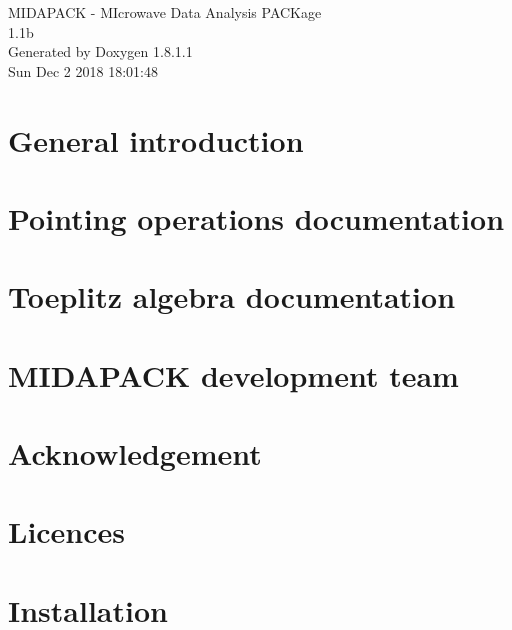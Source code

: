 \documentclass{book}
\begin{document}
\hypersetup{pageanchor=false,citecolor=blue}
\begin{titlepage}
\vspace*{7cm}
\begin{center}
{\Large M\-I\-D\-A\-P\-A\-C\-K -\/ M\-Icrowave Data Analysis P\-A\-C\-Kage \\[1ex]\large 1.\-1b }\\
\vspace*{1cm}
{\large Generated by Doxygen 1.8.1.1}\\
\vspace*{0.5cm}
{\small Sun Dec 2 2018 18:01:48}\\
\end{center}
\end{titlepage}
\clearemptydoublepage
{}
\tableofcontents
\clearemptydoublepage
{}
\hypersetup{pageanchor=true,citecolor=blue}
\chapter{General introduction}
\label{index}\hypertarget{index}{}
\chapter{Pointing operations documentation}
\label{pointing}
\hypertarget{pointing}{}

\chapter{Toeplitz algebra documentation}
\label{toeplitz}
\hypertarget{toeplitz}{}

\chapter{M\-I\-D\-A\-P\-A\-C\-K development team}
\label{sect_team}
\hypertarget{sect_team}{}

\chapter{Acknowledgement}
\label{sect_ackno}
\hypertarget{sect_ackno}{}

\chapter{Licences}
\label{page_license}
\hypertarget{page_license}{}

\chapter{Installation}
\label{page_install}
\hypertarget{page_install}{}

\end{document}
